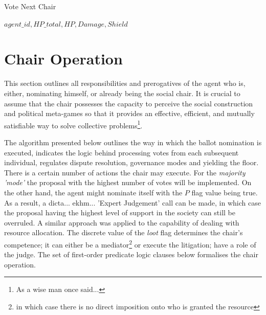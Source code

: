 

\begin{algorithm}
\caption{Vote Next Chair}\label{alg:19}
\begin{algorithmic}
\scriptsize
\Require $agent\_id, HP\_total, HP, Damage, Shield$

\end{algorithmic}
\end{algorithm}

\clearpage

\section{Chair Operation}

This section outlines all responsibilities and prerogatives of the agent who is, either, nominating himself, or already being the social chair. It is crucial to assume that the chair possesses the capacity to perceive the social construction and political meta-games so that it provides an effective, efficient, and mutually satisfiable way to solve collective problems\footnote {As a wise man once said...}.

The algorithm presented below outlines the way in which the ballot nomination is executed, indicates the logic behind processing votes from each subsequent individual, regulates dispute resolution, governance modes and yielding the floor. There is a certain number of actions the chair may execute. For the \textit{majority 'mode'} the proposal with the highest number of votes will be implemented. On the other hand, the agent might nominate itself with the $P$ flag value being true. As a result, a dicta... ekhm... 'Expert Judgement' call can be made,  in which case the proposal having the highest level of support in the society can still be overruled. A similar approach was applied to the capability of dealing with resource allocation. The discrete value of the \textit{loot} flag determines the chair's competence; it can either be a mediator\footnote{in which case there is no direct imposition onto who is granted the resource} or execute the litigation; have a role of the judge. The set of first-order predicate logic clauses below formalises the chair operation.

